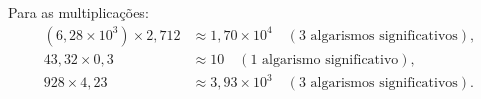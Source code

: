 Para as multiplicações:
\begin{align*}
(6{,}28\times10^{3})\times2{,}712 &\approx 1{,}70\times10^{4} \quad(3\text{ algarismos significativos}),\\
43{,}32\times0{,}3 &\approx 10 \quad(1\text{ algarismo significativo}),\\
928\times4{,}23 &\approx 3{,}93\times10^{3} \quad(3\text{ algarismos significativos}).
\end{align*}